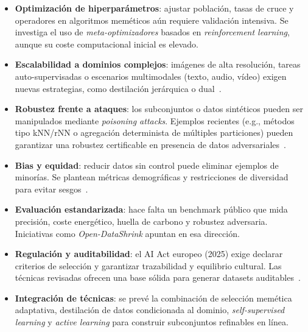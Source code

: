 \begin{itemize}
      \item \textbf{Optimización de hiperparámetros}: ajustar población, tasas de cruce y operadores en algoritmos meméticos aún requiere validación intensiva.
            Se investiga el uso de \textit{meta-optimizadores} basados en \textit{reinforcement learning}, aunque su coste computacional inicial es elevado.

      \item \textbf{Escalabilidad a dominios complejos}: imágenes de alta resolución, tareas auto-supervisadas o escenarios multimodales (texto, audio, vídeo) exigen nuevas estrategias,
            como destilación jerárquica o dual~\cite{liGenerativeDatasetDistillation2024a, liGenerativeDatasetDistillation2024}.

      \item \textbf{Robustez frente a ataques}: los subconjuntos o datos sintéticos pueden ser manipulados mediante \textit{poisoning attacks}.
            Ejemplos recientes (e.g., métodos tipo kNN/rNN o agregación determinista de múltiples particiones)
            pueden garantizar una robustez certificable en presencia de datos adversariales~\cite{jiaCertifiedRobustnessNearest2021, wangImprovedCertifiedDefenses2022}.

      \item \textbf{Bias y equidad}: reducir datos sin control puede eliminar ejemplos de minorías.
            Se plantean métricas demográficas y restricciones de diversidad para evitar sesgos~\cite{buolamwiniGenderShadesIntersectional}.

      \item \textbf{Evaluación estandarizada}: hace falta un benchmark público que mida precisión, coste energético, huella de carbono y robustez adversaria.
            Iniciativas como \textit{Open-DataShrink} apuntan en esa dirección.

      \item \textbf{Regulación y auditabilidad}: el AI Act europeo (2025) exige declarar criterios de selección y garantizar trazabilidad y equilibrio cultural.
            Las técnicas revisadas ofrecen una base sólida para generar datasets auditables~\cite{RegulationEU20242024}.

      \item \textbf{Integración de técnicas}: se prevé la combinación de selección memética adaptativa, destilación de datos condicionada al dominio,
            \textit{self-supervised learning} y \textit{active learning} para construir subconjuntos refinables en línea.
\end{itemize}